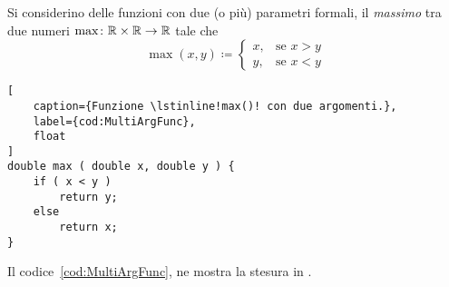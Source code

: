 Si considerino delle funzioni con due (o più) parametri formali, il \emph{massimo} tra due numeri $\max\colon\mathbb{R}\times\mathbb{R}\to\mathbb{R}$ tale che 
\[
\mathop{\mathrm{max}}(x,y)\coloneqq
		\begin{cases}
x,	& \text{se } x>y \\
y,	& \text{se } x<y
		\end{cases}
\]
\begin{lstlisting}[
	caption={Funzione \lstinline!max()! con due argomenti.},
	label={cod:MultiArgFunc},
	float
]
double max ( double x, double y ) {
	if ( x < y )
		return y;
	else
		return x;
}
\end{lstlisting}
Il codice~\ref{cod:MultiArgFunc}, ne mostra la stesura in .
